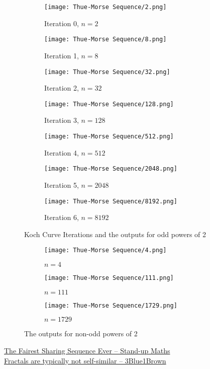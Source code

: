 \begin{figure}[H]
	\centering
	\begin{subfigure}{0.3\linewidth}
		\texttt{[image: Thue-Morse Sequence/2.png]}
		\caption{Iteration 0, $n=2$}
	\end{subfigure}
	\begin{subfigure}{0.3\linewidth}
		\texttt{[image: Thue-Morse Sequence/8.png]}
		\caption{Iteration 1, $n=8$}
	\end{subfigure}
	\begin{subfigure}{0.3\linewidth}
		\texttt{[image: Thue-Morse Sequence/32.png]}
		\caption{Iteration 2, $n=32$}
	\end{subfigure}
	\begin{subfigure}{0.3\linewidth}
		\texttt{[image: Thue-Morse Sequence/128.png]}
		\caption{Iteration 3, $n=128$}
	\end{subfigure}
	\begin{subfigure}{0.3\linewidth}
		\texttt{[image: Thue-Morse Sequence/512.png]}
		\caption{Iteration 4, $n=512$}
	\end{subfigure}
	\begin{subfigure}{0.3\linewidth}
		\texttt{[image: Thue-Morse Sequence/2048.png]}
		\caption{Iteration 5, $n=2048$}
	\end{subfigure}
	\begin{subfigure}{0.3\linewidth}
		\texttt{[image: Thue-Morse Sequence/8192.png]}
		\caption{Iteration 6, $n=8192$}
	\end{subfigure}
	\caption{Koch Curve Iterations and the outputs for odd powers of 2}
\end{figure}
\begin{figure}[H]
	\centering
	\begin{subfigure}{0.3\linewidth}
		\texttt{[image: Thue-Morse Sequence/4.png]}
		\caption{$n=4$}
	\end{subfigure}
	\begin{subfigure}{0.3\linewidth}
		\texttt{[image: Thue-Morse Sequence/111.png]}
		\caption{$n=111$}
	\end{subfigure}
	\begin{subfigure}{0.3\linewidth}
		\texttt{[image: Thue-Morse Sequence/1729.png]}
		\caption{$n=1729$}
	\end{subfigure}
	\caption{The outputs for non-odd powers of 2}
\end{figure}
\begin{funvideo}
	\href{https://youtu.be/prh72BLNjIk}{The Fairest Sharing Sequence Ever -- Stand-up Maths}\\
	\href{https://youtu.be/gB9n2gHsHN4}{Fractals are typically not self-similar -- 3Blue1Brown}
\end{funvideo}
\recalctypearea
